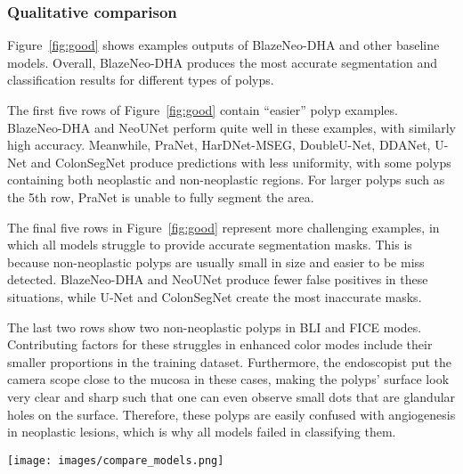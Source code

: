 \documentclass{ieeeaccess}
\newcommand{\DHA}{BlazeNeo-DHA\xspace}
\begin{document}
\subsubsection{Qualitative comparison}
Figure~\ref{fig:good} shows examples outputs of \DHA and other baseline models. Overall, \DHA produces the most accurate segmentation and classification results for different types of polyps.

The first five rows of Figure~\ref{fig:good} contain ``easier'' polyp examples. \DHA and NeoUNet perform quite well in these examples, with similarly high accuracy. Meanwhile, PraNet, HarDNet-MSEG, DoubleU-Net, DDANet, U-Net and ColonSegNet produce predictions with less uniformity, with some polyps containing both neoplastic and non-neoplastic regions. For larger polyps such as the 5th row, PraNet is unable to fully segment the area.

The final five rows in Figure~\ref{fig:good} represent more challenging examples, in which all models struggle to provide accurate segmentation masks. This is because non-neoplastic polyps are usually small in size and easier to be miss detected. \DHA and NeoUNet produce fewer false positives in these situations, while U-Net and ColonSegNet create the most inaccurate masks.

The last two rows show two non-neoplastic polyps in BLI and FICE modes. Contributing factors for these struggles in enhanced color modes include their smaller proportions in the training dataset. Furthermore, the endoscopist put the camera scope close to the mucosa in these cases, making the polyps' surface look very clear and sharp such that one can even observe small dots that are glandular holes on the surface. Therefore, these polyps are easily confused with angiogenesis in neoplastic lesions, which is why all models failed in classifying them.



\begin{center}
    \begin{figure*}[th!]
        \begin{center}
            \texttt{[image: images/compare\_models.png]}
        \end{center}
        \caption{Qualitative comparison of the proposed method with other baseline methods: (a) image, (b) ground truth, (c) BlazeNeo (Ours), (d) NeoUNet, (e) PraNet, (f) HarDNet-MSEG, (g) UNet, (h) DoubleU-Net, (i) DDANet, and (j) ColonSegNet.}
        \label{fig:good}
    \end{figure*}
\end{center}
\end{document}

